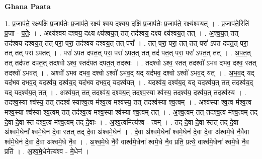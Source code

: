 \documentclass[17pt]{extarticle}
\begin{document}
\textbf{Ghana Paata } \newline

1. प्र॒जाप॑ते॒ रक्ष्यक्षि॑ प्र॒जाप॑तेः प्र॒जाप॑ते॒ रक्ष्य॑ श्वय दश्वय॒ दक्षि॑ प्र॒जाप॑तेः प्र॒जाप॑ते॒ रक्ष्य॑श्वयत् । . प्र॒जाप॑ते॒रिति॑ प्र॒जा - प॒तेः॒ । . अक्ष्य॑श्वय दश्वय॒ दक्ष्य क्ष्य॑श्वय॒त् तत् तद॑श्वय॒ दक्ष्य क्ष्य॑श्वय॒त् तत् । . अ॒श्व॒य॒त् तत् तद॑श्वय दश्वय॒त् तत् परा॒ परा॒ तद॑श्वय दश्वय॒त् तत् परा᳚ । . तत् परा॒ परा॒ तत् तत् परा॑ ऽपत दपत॒त् परा॒ तत् तत् परा॑ ऽपतत् । . परा॑ ऽपत दपत॒त् परा॒ परा॑ ऽपत॒त् तत् तद॑ पत॒त् परा॒ परा॑ ऽपत॒त् तत् । . अ॒प॒त॒त् तत् तद॑पत दपत॒त् तदश्वो ऽश्व॒ स्तद॑पत दपत॒त् तदश्वः॑ । . तदश्वो ऽश्व॒ स्तत् तदश्वो॑ ऽभव दभव॒ दश्व॒ स्तत् तदश्वो॑ ऽभवत् । . अश्वो॑ ऽभव दभव॒ दश्वो ऽश्वो॑ ऽभव॒द् यद् यद॑भव॒ दश्वो ऽश्वो॑ ऽभव॒द् यत् । . अ॒भ॒व॒द् यद् यद॑भव दभव॒द् यदश्व॑य॒ दश्व॑य॒द् यद॑भव दभव॒द् यदश्व॑यत् । . यदश्व॑य॒ दश्व॑य॒द् यद् यदश्व॑य॒त् तत् तदश्व॑य॒द् यद् यदश्व॑य॒त् तत् । . अश्व॑य॒त् तत् तदश्व॑य॒ दश्व॑य॒त् तदश्व॒स्या श्व॑स्य॒ तदश्व॑य॒ दश्व॑य॒त् तदश्व॑स्य । . तदश्व॒स्या श्व॑स्य॒ तत् तदश्व॑ स्याश्व॒त्व म॑श्व॒त्व मश्व॑स्य॒ तत् तदश्व॑स्या श्व॒त्वम् । . अश्व॑स्या श्व॒त्व म॑श्व॒त्व मश्व॒स्या श्व॑स्या श्व॒त्वम् तत् तद॑श्व॒त्व मश्व॒स्या श्व॑स्या श्व॒त्वम् तत् । . अ॒श्व॒त्वम् तत् तद॑श्व॒त्व म॑श्व॒त्वम् तद् दे॒वा दे॒वा स्त द॑श्व॒त्व म॑श्व॒त्वम् तद् दे॒वाः । . अ॒श्व॒त्वमित्य॑श्व - त्वम् । . तद् दे॒वा दे॒वा स्तत् तद् दे॒वा अ॑श्वमे॒धेना᳚ श्वमे॒धेन॑ दे॒वा स्तत् तद् दे॒वा अ॑श्वमे॒धेन॑ । . दे॒वा अ॑श्वमे॒धेना᳚ श्वमे॒धेन॑ दे॒वा दे॒वा अ॑श्वमे॒धे नै॒वैवा श्व॑मे॒धेन॑ दे॒वा दे॒वा अ॑श्वमे॒धे नै॒व । . अ॒श्व॒मे॒धे नै॒वै वाश्व॑मे॒धेना᳚ श्वमे॒धे नै॒व प्रति॒ प्रत्ये॒ वाश्व॑मे॒धेना᳚ श्वमे॒धे नै॒व प्रति॑ । . अ॒श्व॒मे॒धेनेत्य॑श्व - मे॒धेन॑ । \newline
\end{document}
